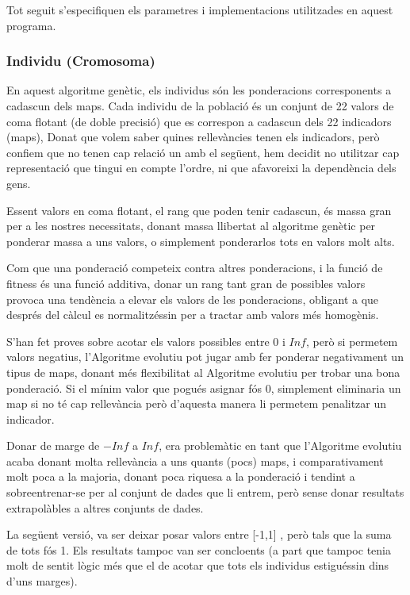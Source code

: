 \documentclass[titlepage,a4paper,12pt]{book}
\begin{document}
Tot seguit s'especifiquen els parametres i implementacions utilitzades en aquest
programa.

\subsubsection{Individu (Cromosoma)}
\label{ssub:individu (cromosoma)}

En aquest algoritme genètic, els individus són les ponderacions corresponents a
cadascun dels maps.  Cada individu de la població és un conjunt de 22 valors de
coma flotant (de doble precisió) que es correspon a cadascun dels 22 indicadors
(maps),  Donat que volem saber quines rellevàncies tenen els indicadors, però
confiem que no tenen cap relació un amb el següent, hem decidit no utilitzar cap
representació que tingui en compte l'ordre, ni que afavoreixi la dependència
dels gens. %

Essent valors en coma flotant, el rang que poden tenir cadascun, és massa gran
per a les nostres necessitats, donant massa llibertat al algoritme genètic per
ponderar massa a uns valors, o simplement ponderarlos tots en valors molt alts.

Com que una ponderació competeix contra altres ponderacions, i la funció de
fitness és una funció additiva, donar un rang tant gran de possibles valors
provoca una tendència a elevar els valors de les ponderacions, obligant a que
després del càlcul es normalitzéssin per a tractar amb valors més homogènis.

S'han fet proves sobre acotar els valors possibles entre 0 i $Inf$, però si
permetem valors negatius, l'Algoritme evolutiu pot jugar amb fer ponderar
negativament un tipus de maps, donant més flexibilitat al Algoritme evolutiu per
trobar una bona ponderació.  Si el mínim valor que pogués asignar fós 0,
simplement eliminaria un map si no té cap rellevància però d'aquesta manera li
permetem penalitzar un indicador.

Donar de marge de $-Inf$ a $Inf$, era problemàtic en tant que l'Algoritme
evolutiu acaba donant molta rellevància a uns quants (pocs) maps, i
comparativament molt poca a la majoria, donant poca riquesa a la ponderació i
tendint a sobreentrenar-se per al conjunt de dades que li entrem, però sense
donar resultats extrapolàbles a altres conjunts de dades.

La següent versió, va ser deixar posar valors entre [-1,1] , però tals que la
suma de tots fós 1.  Els resultats tampoc van ser concloents (a part que tampoc
tenia molt de sentit lògic més que el de acotar que tots els individus
estiguéssin dins d'uns marges).
\end{document}
